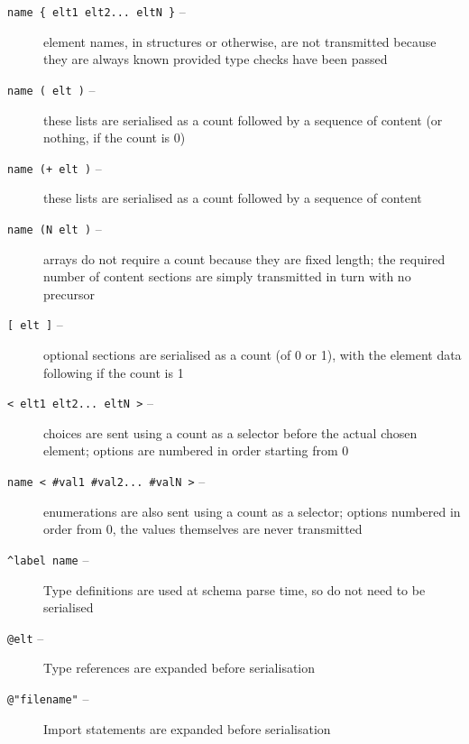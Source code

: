 \documentclass[12pt,a4paper,twoside]{article}
\renewcommand{\_}{\texttt{\symbol{95}}}
\begin{document}
\begin{description}
\item[\texttt{name \{ elt1 elt2... eltN \}} --] element names, in structures
	or otherwise, are not transmitted because they are always known
	provided type checks have been passed
\item[\texttt{name ( elt )} --] these lists are serialised as a count followed
	by a sequence of content (or nothing, if the count is 0)
\item[\texttt{name (+ elt )} --] these lists are serialised as a count
	followed by a sequence of content
\item[\texttt{name (N elt )} --] arrays do not require a count because they
	are fixed length; the required number of content sections are simply
	transmitted in turn with no precursor
\item[\texttt{[ elt ]} --] optional sections are serialised as a count
	(of 0 or 1), with the element data following if the count is 1
\item[\texttt{< elt1 elt2... eltN >} --] choices are sent using a count as a
	selector before the actual chosen element; options are numbered in order
	starting from 0
\item[\texttt{name < \#val1 \#val2... \#valN >} --] enumerations are also sent
	using a count as a selector; options numbered in order from 0,
	the values themselves are never transmitted
\item[\texttt{\^{ }label name} --] Type definitions are used at schema
	parse time, so do not need to be serialised
\item[\texttt{@elt} --] Type references are expanded before serialisation
\item[\texttt{@"filename"} --] Import statements are expanded before
	serialisation
\end{description}
\end{document}
